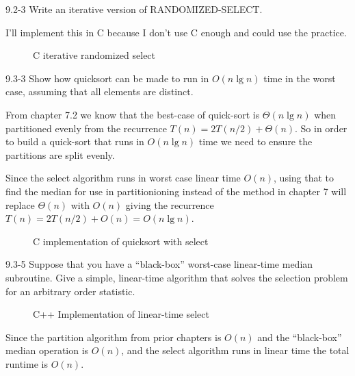 

\usepackage{listings}




\homeworkheader{\classnameandsection}

\begin{problem}{9.2-3}
  Write an iterative version of RANDOMIZED-SELECT.
  \begin{solution}
    I'll implement this in C because I don't use C enough and could use the practice.
    \begin{figure}[H]
      \centering
      \caption{C iterative randomized select}
      
    \end{figure}
  \end{solution}
\end{problem}

\begin{problem}{9.3-3}
  Show how quicksort can be made to run in $O(n \lg n)$ time in the worst case, assuming that all elements are
  distinct.
  \begin{solution}
    From chapter 7.2 we know that the best-case of quick-sort is $\Theta(n \lg n)$ when partitioned evenly from the
    recurrence $T(n) = 2T(n/2) + \Theta(n)$. So in order to build a quick-sort that runs in $O(n \lg n)$ time we need to
    ensure the partitions are split evenly.

    Since the select algorithm runs in worst case linear time $O(n)$, using that to find the median for use in
    partitionioning instead of the method in chapter 7 will replace $\Theta(n)$ with $O(n)$ giving the recurrence $T(n)
    = 2T(n/2) + O(n) = O(n \lg n)$.
    \begin{figure}[H]
      \centering
      \caption{C implementation of quicksort with select}
      
    \end{figure}
  \end{solution}
\end{problem}

\begin{problem}{9.3-5}
  Suppose that you have a ``black-box'' worst-case linear-time median subroutine. Give a simple, linear-time algorithm
  that solves the selection problem for an arbitrary order statistic.
  \begin{solution}
    \begin{figure}[H]
      \centering
      \caption{C++ Implementation of linear-time select}
      
    \end{figure}
    Since the partition algorithm from prior chapters is $O(n)$ and the ``black-box'' median operation is $O(n)$, and
    the select algorithm runs in linear time the total runtime is $O(n)$.
  \end{solution}
\end{problem}

